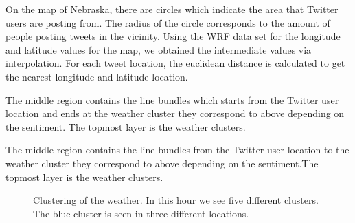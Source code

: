 \documentclass[journal]{vgtc}                %
\begin{document}
On the map of Nebraska, there are circles which indicate the area that Twitter users are posting from. The radius of the circle corresponds to the amount of people posting tweets in the vicinity. Using the WRF data set for the longitude and latitude values for the map, we obtained the intermediate values via interpolation. For each tweet location, the euclidean distance is calculated to get the nearest longitude and latitude location.

The middle region contains the line bundles which starts from the Twitter user location and ends at the weather cluster they correspond to above depending on the sentiment. The topmost layer is the weather clusters.

The middle region contains the line bundles from the Twitter user location to the weather cluster they correspond to above depending on the sentiment.The topmost layer is the weather clusters.

\begin{figure}[htp]
  \centering
  \quad
\caption{Clustering of the weather. In this hour we see five different clusters. The blue cluster is seen in three different locations.}
\label{main figure label}
\end{figure}
\end{document}
